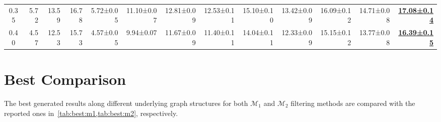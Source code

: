 \documentclass[a4paper,10pt,conference]{IEEEtran}
\begin{document}
\begin{table*}[ht]
{\begin{tabular}{@{}crrrrrrrrrrrr@{}}
			0.35        & 5.72                                       & 13.59                                                                    & 16.78                                 & 5.72±0.05                     & 11.10±0.07                            & 12.81±0.09                            & 12.53±0.11                            & 15.10±0.10                            & 13.42±0.09                            & 16.09±0.12                            & 14.71±0.08                            & \underline{\textbf{17.08±0.14}}       \\
			0.40        & 4.57                                       & 12.53                                                                    & 15.73                                 & 4.57±0.05                     & 9.94±0.07                             & 11.67±0.09                            & 11.40±0.11                            & 14.04±0.11                            & 12.33±0.09                            & 15.15±0.12                            & 13.77±0.08                            & \underline{\textbf{16.39±0.15}}       \\
			\bottomrule
		\end{tabular}
	}
\end{table*}

\section{Best Comparison}
The best generated results along different underlying graph structures for both \(\mathcal{M}_1\) and \(\mathcal{M}_2\) filtering methods are compared with the reported ones in~\cref{tab:best:m1,tab:best:m2}, respectively.
\end{document}
